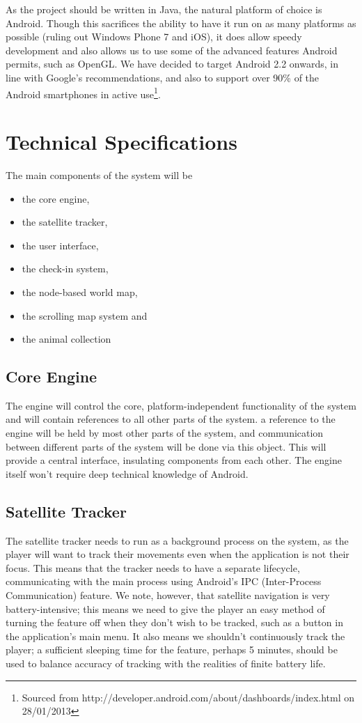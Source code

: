 \documentclass[12pt,a4paper,twoside]{article}
\begin{document}
As the project should be written in Java, the natural platform of choice is Android.
Though this sacrifices the ability to have it run on as many platforms as possible (ruling out Windows Phone 7 and iOS), it does allow speedy development and also allows us to use some of the advanced features Android permits, such as OpenGL.
We have decided to target Android 2.2 onwards, in line with Google's recommendations, and also to support over 90\% of the Android smartphones in active use\footnote{Sourced from http://developer.android.com/about/dashboards/index.html on 28/01/2013}.

\section{Technical Specifications}
The main components of the system will be
\begin{itemize}
\item the core engine,
\item the satellite tracker,
\item the user interface,
\item the check-in system,
\item the node-based world map,
\item the scrolling map system and
\item the animal collection
\end{itemize}

\subsection{Core Engine}
The engine will control the core, platform-independent functionality of the system and will contain references to all other parts of the system.
a reference to the engine will be held by most other parts of the system, and communication between different parts of the system will be done via this object.
This will provide a central interface, insulating components from each other.
The engine itself won't require deep technical knowledge of Android.

\subsection{Satellite Tracker}
The satellite tracker needs to run as a background process on the system, as the player will want to track their movements even when the application is not their focus.
This means that the tracker needs to have a separate lifecycle, communicating with the main process using Android's IPC (Inter-Process Communication) feature.
We note, however, that satellite navigation is very battery-intensive; this means we need to give the player an easy method of turning the feature off when they don't wish to be tracked, such as a button in the application's main menu.
It also means we shouldn't continuously track the player; a sufficient sleeping time for the feature, perhaps 5 minutes, should be used to balance accuracy of tracking with the realities of finite battery life.
\end{document}
